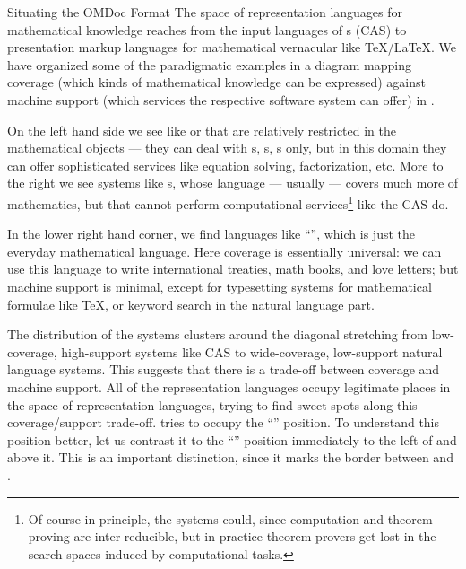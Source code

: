 \begin{omgroup}[id=omdoc-markup,short=Open Mathematical Documents]
\begin{module}[id=situating-OMDoc]
\begin{omgroup}{Situating the OMDoc Format}
  The space of representation languages for mathematical knowledge reaches from the input
  languages of {s} (CAS) to presentation markup
  languages for mathematical vernacular like {\TeX/\LaTeX}. We have organized some of the
  paradigmatic examples in a diagram mapping coverage (which kinds of mathematical
  knowledge can be expressed) against machine support (which services the respective
  software system can offer) in {}.

\begin{myfig}{situating}{Situating Content Markup: Math. Knowledge Management}
  \texttt{[image: \\figuresPath\{support-coverage]}}
\end{myfig}

On the left hand side we see {} like {\mathematica}\cite{Wolfram.02} or
{\maple} {\cite{ChaGed:flatim92}} that are relatively restricted in the mathematical
objects --- they can deal with {s}, {s}, {s} only, but in this domain they
can offer sophisticated services like equation solving, factorization, etc.  More to the
right we see systems like {s},
whose language --- usually {} --- covers much more of
mathematics, but that cannot perform computational services\footnote{Of course in
  principle, the systems could, since computation and theorem proving are inter-reducible,
  but in practice theorem provers get lost in the search spaces induced by computational
  tasks.}  like the CAS do.

In the lower right hand corner, we find languages like
``{}'', which is just the everyday mathematical
language. Here coverage is essentially universal: we can use this language to write
international treaties, math books, and love letters; but machine support is minimal,
except for typesetting systems for mathematical formulae like {\TeX}, or keyword search in
the natural language part.

The distribution of the systems clusters around the diagonal stretching from low-coverage,
high-support systems like CAS to wide-coverage, low-support natural language systems. This
suggests that there is a trade-off between coverage and machine support. All of the
representation languages occupy legitimate places in the space of representation
languages, trying to find sweet-spots along this coverage/support trade-off. {\omdoc}
tries to occupy the ``{}'' position. To understand this position
better, let us contrast it to the ``{}'' position immediately to
the left of and above it. This is an important distinction, since it marks the border
between  and {}.


\end{omgroup}
\end{module}
\end{omgroup}
